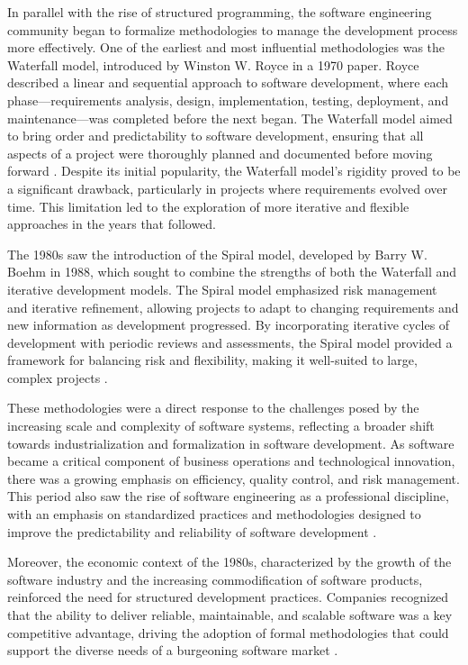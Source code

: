 \begin{refsection}
In parallel with the rise of structured programming, the software engineering community began to formalize methodologies to manage the development process more effectively. One of the earliest and most influential methodologies was the Waterfall model, introduced by Winston W. Royce in a 1970 paper. Royce described a linear and sequential approach to software development, where each phase—requirements analysis, design, implementation, testing, deployment, and maintenance—was completed before the next began. The Waterfall model aimed to bring order and predictability to software development, ensuring that all aspects of a project were thoroughly planned and documented before moving forward \cite[pp.~1-9]{royce1970managing}. Despite its initial popularity, the Waterfall model's rigidity proved to be a significant drawback, particularly in projects where requirements evolved over time. This limitation led to the exploration of more iterative and flexible approaches in the years that followed.

The 1980s saw the introduction of the Spiral model, developed by Barry W. Boehm in 1988, which sought to combine the strengths of both the Waterfall and iterative development models. The Spiral model emphasized risk management and iterative refinement, allowing projects to adapt to changing requirements and new information as development progressed. By incorporating iterative cycles of development with periodic reviews and assessments, the Spiral model provided a framework for balancing risk and flexibility, making it well-suited to large, complex projects \cite[pp.~61-72]{boehm1988spiral}.

These methodologies were a direct response to the challenges posed by the increasing scale and complexity of software systems, reflecting a broader shift towards industrialization and formalization in software development. As software became a critical component of business operations and technological innovation, there was a growing emphasis on efficiency, quality control, and risk management. This period also saw the rise of software engineering as a professional discipline, with an emphasis on standardized practices and methodologies designed to improve the predictability and reliability of software development \cite[pp.~33-37]{brooks1995mythical}.

Moreover, the economic context of the 1980s, characterized by the growth of the software industry and the increasing commodification of software products, reinforced the need for structured development practices. Companies recognized that the ability to deliver reliable, maintainable, and scalable software was a key competitive advantage, driving the adoption of formal methodologies that could support the diverse needs of a burgeoning software market \cite[pp.~201-204]{campbellkelly2004computer}. 


\end{refsection}
